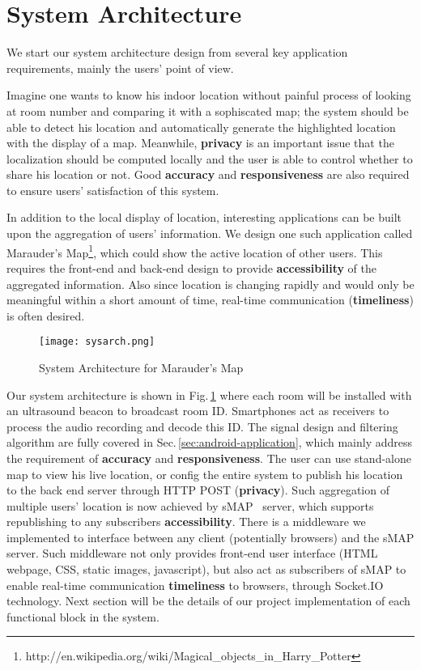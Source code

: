 \section{System Architecture}
\label{sec:system-architecture}
We start our system architecture design from several key application requirements, mainly the users' point of view.

Imagine one wants to know his indoor location without painful process of looking at room number and comparing it with a sophiscated map; the system should be able to detect his location and automatically generate the highlighted location with the display of a map. Meanwhile, {\bf privacy} is an important issue that the localization should be computed locally and the user is able to control whether to share his location or not. Good {\bf accuracy} and {\bf responsiveness} are also required to ensure users' satisfaction of this system.  

In addition to the local display of location, interesting applications can be built upon the aggregation of users' information. We design one such application called Marauder's Map\footnote{http://en.wikipedia.org/wiki/Magical\_objects\_in\_Harry\_Potter}, which could show the active location of other users. This requires the front-end and back-end design to provide {\bf accessibility} of the aggregated information. Also since location is changing rapidly and would only be meaningful within a short amount of time, real-time communication ({\bf timeliness}) is often desired.

\begin{figure}
  \centering
  \texttt{[image: sysarch.png]}
  \caption{System Architecture for Marauder's Map}
  \label{fig:sysarch}
\end{figure}

Our system architecture is shown in Fig.\,\ref{fig:sysarch} where each room will be installed with an ultrasound beacon to broadcast room ID. Smartphones act as receivers to process the audio recording and decode this ID. The signal design and filtering algorithm are fully covered in Sec.\,\ref{sec:android-application}, which mainly address the requirement of {\bf accuracy} and {\bf responsiveness}. The user can use stand-alone map to view his live location, or config the entire system to publish his location to the back end server through HTTP POST ({\bf privacy}). Such aggregation of multiple users' location is now achieved by sMAP~\cite{dawson2010smap} server, which supports republishing to any subscribers {\bf accessibility}. There is a middleware we implemented to interface between any client (potentially browsers) and the sMAP server. Such middleware not only provides front-end user interface (HTML webpage, CSS, static images, javascript), but also act as subscribers of sMAP to enable real-time communication {\bf timeliness} to browsers, through Socket.IO~\cite{socketio} technology. Next section will be the details of our project implementation of each functional block in the system.

